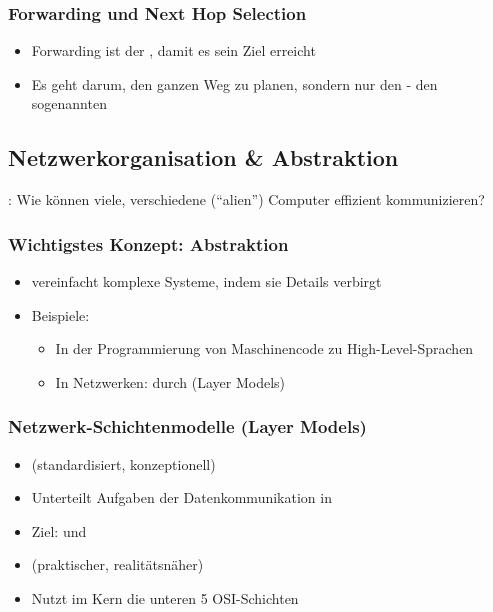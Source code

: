 \subsubsection*{Forwarding und Next Hop Selection}
\begin{itemize}
    \item Forwarding ist der , damit es sein Ziel erreicht
    \item Es geht  darum, den ganzen Weg zu planen, sondern nur den  - den sogenannten 
\end{itemize}
\clearpage
\subsection{Netzwerkorganisation \& Abstraktion}
: Wie können viele, verschiedene (\enquote{alien}) Computer effizient kommunizieren?
\subsubsection*{Wichtigstes Konzept: Abstraktion}
\begin{itemize}
    \item {} vereinfacht komplexe Systeme, indem sie Details verbirgt
    \item Beispiele:
    \begin{itemize}
        \item In der Programmierung von Maschinencode zu High-Level-Sprachen
        \item In Netzwerken: durch  (Layer Models)
    \end{itemize}
\end{itemize}
\subsubsection*{Netzwerk-Schichtenmodelle (Layer Models)}
\begin{itemize}
    \item {} (standardisiert, konzeptionell)
    \item Unterteilt Aufgaben der Datenkommunikation in 
    \item Ziel:  und 
\end{itemize}
\begin{itemize}
    \item {} (praktischer, realitätsnäher)
    \item Nutzt im Kern die unteren 5 OSI-Schichten
\end{itemize}
